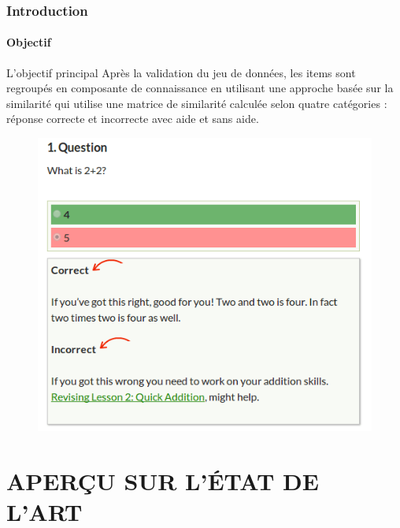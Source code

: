 \documentclass[aspectratio=169,professionalfonts, 12pt]{beamer}
\begin{document}
\begin{frame}
  \frametitle{Introduction}
  \framesubtitle{Objectif}
  \begin{minipage}{0.4\textwidth}
    \begin{block}{L'objectif principal}
      Après la validation du jeu de données, les items sont regroupés en composante de connaissance en utilisant une approche basée sur la similarité qui utilise une matrice de similarité calculée selon quatre catégories : réponse correcte et incorrecte avec aide et sans aide.
    \end{block} 
  \end{minipage}
  \begin{minipage}{2cm}
  
  \end{minipage}
  \begin{minipage}{0.5\textwidth}
    \begin{figure}[t]
    \begin{center}
      \includegraphics[width=\textwidth]{images/etat_art/quiz_response2.png}
    \end{center}
    \end{figure} 
  \end{minipage}
\end{frame}

\section{APERÇU SUR L'\'ETAT DE L'ART}
\end{document}
